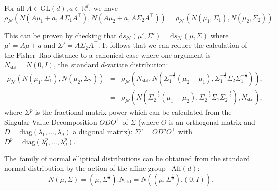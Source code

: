 \documentclass[entropy,article,accept,oneauthor,pdftex,entropy]{Definitions/mdpi}
\def\GL{\mathrm{GL}}
\def\diag{\mathrm{diag}}
\def\Aff{\mathrm{Aff}}
\def\bbR{\mathbb{R}}
\def\calN{\mathcal{N}}
\def\Aff{\mathrm{Aff}}
\def\std{\mathrm{std}}
\def\ds{\mathrm{d}s}
\def\bbR{\mathbb{R}}
\begin{document}
\begin{Property}\label{prop:aifr}
For all $A\in\GL(d), a\in\bbR^d$, we have
\begin{equation}
\rho_{\calN}(N(A\mu_1+a,A\Sigma_1A^\top),N(A\mu_2+a,A\Sigma_2A^\top))=\rho_{\calN}(N(\mu_1,\Sigma_1),N(\mu_2,\Sigma_2)).
\end{equation}
\end{Property}
This can be proven by checking that $\ds_\calN(\mu',\Sigma')=\ds_\calN(\mu,\Sigma)$ where $\mu'=A\mu+a$ and $\Sigma'=A\Sigma_2A^\top$.
It follows that we can reduce the calculation of the Fisher--Rao distance to a canonical case where one argument is
$N_\std=N(0,I)$, the~standard $d$-variate distribution:
\begin{eqnarray*}
\rho_{\calN}(N(\mu_1,\Sigma_1),N(\mu_2,\Sigma_2)) &=&
\rho_{\calN}\left(N_\std,N\left(\Sigma_1^{-\frac{1}{2}}(\mu_2-\mu_1),\Sigma_1^{-\frac{1}{2}}\Sigma_2\Sigma_1^{-\frac{1}{2}}\right)\right),\\
&=&
\rho_{\calN}\left(N\left(\Sigma_2^{-\frac{1}{2}}(\mu_1-\mu_2),\Sigma_2^{-\frac{1}{2}}\Sigma_1\Sigma_2^{-\frac{1}{2}}\right),N_\std\right),
\end{eqnarray*}
where $\Sigma^p$ is the fractional matrix power which can be calculated from the Singular Value Decomposition $O D O^\top$ of $\Sigma$ (where $O$ is an orthogonal matrix and $D=\diag(\lambda_1,\ldots,\lambda_d)$ a diagonal matrix):
$\Sigma^p=O D^p O^\top$ with $D^p=\diag(\lambda_1^p,\ldots, \lambda_d^p)$.

The~family of normal elliptical distributions can be obtained from the standard normal distribution by the action of the affine group~\cite{SDPElliptical-2002,chen2021upper} $\Aff(d)$:
$$
N(\mu,\Sigma)=(\mu,\Sigma^{\frac{1}{2}}).N_\std=N((\mu,\Sigma^{\frac{1}{2}}).(0,I)).
$$

 
\end{document}
